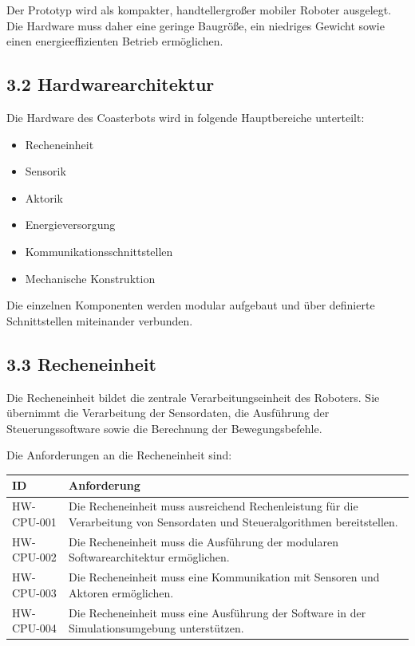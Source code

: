 \documentclass[
]{article}
\providecommand{\tightlist}{%
  \setlength{\itemsep}{0pt}\setlength{\parskip}{0pt}}
\begin{document}
Der Prototyp wird als kompakter, handtellergroßer mobiler Roboter
ausgelegt. Die Hardware muss daher eine geringe Baugröße, ein niedriges
Gewicht sowie einen energieeffizienten Betrieb ermöglichen.

\subsection{3.2 Hardwarearchitektur}\label{hardwarearchitektur}

Die Hardware des Coasterbots wird in folgende Hauptbereiche unterteilt:

\begin{itemize}
\tightlist
\item
  Recheneinheit
\item
  Sensorik
\item
  Aktorik
\item
  Energieversorgung
\item
  Kommunikationsschnittstellen
\item
  Mechanische Konstruktion
\end{itemize}

Die einzelnen Komponenten werden modular aufgebaut und über definierte
Schnittstellen miteinander verbunden.

\subsection{3.3 Recheneinheit}\label{recheneinheit}

Die Recheneinheit bildet die zentrale Verarbeitungseinheit des Roboters.
Sie übernimmt die Verarbeitung der Sensordaten, die Ausführung der
Steuerungssoftware sowie die Berechnung der Bewegungsbefehle.

Die Anforderungen an die Recheneinheit sind:

\begin{longtable}[]{@{}
  >{\raggedright\arraybackslash}p{}
  >{\raggedright\arraybackslash}p{}@{}}
\toprule\noalign{}
\begin{minipage}[b]{\linewidth}\raggedright
ID
\end{minipage} & \begin{minipage}[b]{\linewidth}\raggedright
Anforderung
\end{minipage} \\
\midrule\noalign{}
\endhead
\bottomrule\noalign{}
\endlastfoot
HW-CPU-001 & Die Recheneinheit muss ausreichend Rechenleistung für die
Verarbeitung von Sensordaten und Steueralgorithmen bereitstellen. \\
HW-CPU-002 & Die Recheneinheit muss die Ausführung der modularen
Softwarearchitektur ermöglichen. \\
HW-CPU-003 & Die Recheneinheit muss eine Kommunikation mit Sensoren und
Aktoren ermöglichen. \\
HW-CPU-004 & Die Recheneinheit muss eine Ausführung der Software in der
Simulationsumgebung unterstützen. \\
\end{longtable}
\end{document}
